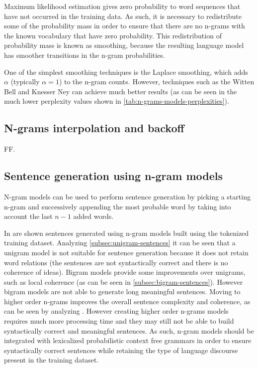 Maximum likelihood estimation gives zero probability to word sequences that have not occurred in the training data. As such, it is necessary to redistribute some of the probability mass in order to ensure that there are no n-grams with the known vocabulary that have zero probability. This redistribution of probability mass is known as smoothing, because the resulting language model has smoother transitions in the n-gram probabilities.

One of the simplest smoothing techniques is the Laplace smoothing, which adds $\alpha$ (typically $\alpha=1$) to the n-gram counts. However, techniques such as the Witten Bell and Knesser Ney can achieve much better results (as can be seen in the much lower perplexity values shown in \cref{tab:n-grams-models-perplexities}).



\subsection{N-grams interpolation and backoff}

FF.



\subsection{Sentence generation using n-gram models}

N-gram models can be used to perform sentence generation by picking a starting n-gram and successively appending the most probable word by taking into account the last $n-1$ added words.

In  are shown sentences generated using n-gram models built using the tokenized training dataset.
Analyzing \cref{subsec:unigram-sentences} it can be seen that a unigram model is not suitable for sentence generation because it does not retain word relations (the sentences are not syntactically correct and there is no coherence of ideas). Bigram models provide some improvements over unigrams, such as local coherence (as can be seen in \cref{subsec:bigram-sentences}). However bigram models are not able to generate long meaningful sentences. Moving to higher order n-grams improves the overall sentence complexity and coherence, as can be seen by analyzing . However creating higher order n-grams models requires much more processing time and they may still not be able to build syntactically correct and meaningful sentences. As such, n-gram models should be integrated with lexicalized probabilistic context free grammars in order to ensure syntactically correct sentences while retaining the type of language discourse present in the training dataset.



